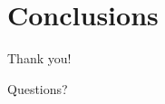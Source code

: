 \documentclass{beamer}
\begin{document}
    \section{Conclusions}
    \label{sec:conclusions}
        \frame{\sectionpage}

        \begin{frame}[plain]
            \begin{center}
                \par{\Huge{Thank you!}}
                \vspace{2.0cm}
                \par{\Huge{Questions?}}
            \end{center}
        \end{frame}
\end{document}
